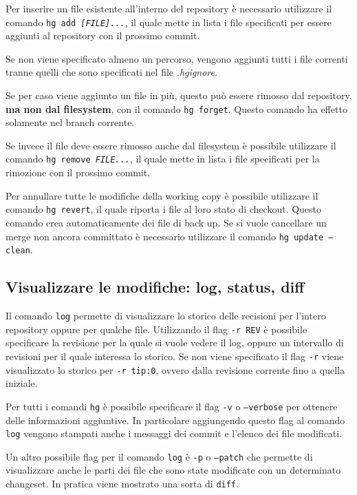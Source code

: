 Per inserire un file esistente all'interno del repository è necessario utilizzare il comando \texttt{hg add \textit{[FILE]...}}, il quale mette in lista i file specificati per essere aggiunti al repository con il prossimo commit.

Se non viene specificato almeno un percorso, vengono aggiunti tutti i file correnti tranne quelli che sono specificati nel file \textit{.hgignore}.

Se per caso viene aggiunto un file in più, questo può essere rimosso dal repository, \textbf{ma non dal filesystem}, con il comando \texttt{hg forget}. Questo comando ha effetto solamente nel branch corrente.

Se invece il file deve essere rimosso anche dal filesystem è possibile utilizzare il comando \texttt{hg remove \textit{FILE...}}, il quale mette in lista i file specificati per la rimozione con il prossimo commit.

Per annullare tutte le modifiche della working copy è possibile utilizzare il comando \texttt{hg revert}, il quale riporta i file al loro stato di checkout.  Questo comando crea automaticamente dei file di back up. 
Se si vuole cancellare un merge non ancora committato è necessario utilizzare il comando \texttt{hg update --clean}.

\subsection{Visualizzare le modifiche: log, status, diff}

Il comando \texttt{log} permette di visualizzare lo storico delle recisioni per l'intero repository oppure per qualche file. Utilizzando il flag \texttt{-r REV} è possibile specificare la revisione per la quale si vuole vedere il log, oppure un intervallo di revisioni per il quale interessa lo storico. Se non viene specificato il flag \texttt{-r} viene visualizzato lo storico per \texttt{-r tip:0}, ovvero dalla revisione corrente fino a quella iniziale.

Per tutti i comandi \texttt{hg} è possibile specificare il flag \texttt{-v} o \texttt{--verbose} per ottenere delle informazioni aggiuntive. In particolare aggiungendo questo flag al comando \texttt{log} vengono stampati anche i messaggi dei commit e l'elenco dei file modificati.

Un altro possibile flag per il comando \texttt{log} è \texttt{-p} o \texttt{--patch} che permette di visualizzare anche le parti dei file che sono state modificate con un determinato changeset. In pratica viene mostrato una sorta di \texttt{diff}.

